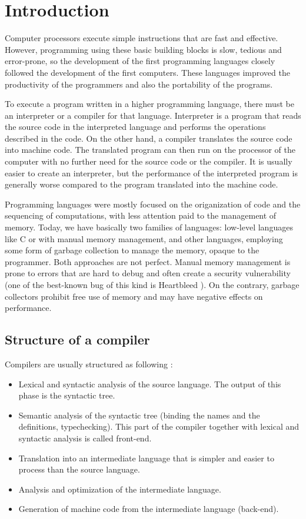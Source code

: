 \chapter{Introduction}

Computer processors execute simple instructions that are fast and effective.
However, programming using these basic building blocks is slow, tedious and
error-prone, so the development of the first programming languages closely
followed the development of the first computers. These languages improved the
productivity of the programmers and also the portability of the programs.

To execute a program written in a higher programming language, there must be an
interpreter or a compiler for that language. Interpreter is a program that reads
the source code in the interpreted language and performs the operations
described in the code. On the other hand, a compiler translates the source code
into machine code. The translated program can then run on the processor of the
computer with no further need for the source code or the compiler. It is usually
easier to create an interpreter, but the performance of the interpreted program
is generally worse compared to the program translated into the machine code.

Programming languages were mostly focused on the origanization of code and the
sequencing of computations, with less attention paid to the management of
memory.  Today, we have basically two families of languages: low-level languages
like C or \Cplusplus{} with manual memory management, and other languages,
employing some form of garbage collection to manage the memory, opaque to the
programmer. Both approaches are not perfect. Manual memory management is prone
to errors that are hard to debug and often create a security vulnerability (one
of the best-known bug of this kind is Heartbleed \cite{heartbleed}).  On the
contrary, garbage collectors prohibit free use of memory and may have negative
effects on performance.

\section{Structure of a compiler}

Compilers are usually structured as following
\cite{grune2012modern,appel1998modern}:

\begin{itemize}
  \item Lexical and syntactic analysis of the source language. The output of
    this phase is the syntactic tree.
  \item Semantic analysis of the syntactic tree (binding the names and the
    definitions, typechecking). This part of the compiler together with lexical
    and syntactic analysis is called front-end.
  \item Translation into an intermediate language that is simpler and easier to
    process than the source language.
  \item Analysis and optimization of the intermediate language.
  \item Generation of machine code from the intermediate language (back-end).
\end{itemize}

